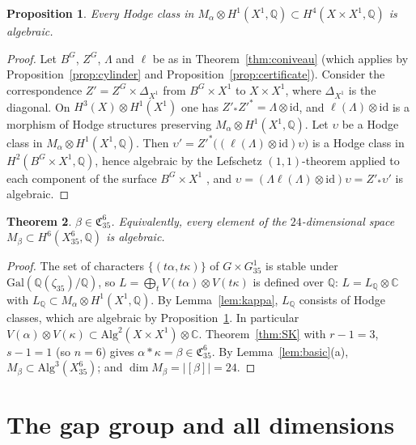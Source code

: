 \documentclass[11pt]{amsart}
\newtheorem{theorem}{Theorem}[section]
\newtheorem{proposition}[theorem]{Proposition}
\theoremstyle{definition}
\theoremstyle{remark}
\numberwithin{equation}{section}
\newcommand{\Q}{\mathbb{Q}}
\newcommand{\C}{\mathbb{C}}
\newcommand{\fC}{\mathfrak{C}}
\begin{document}
\begin{proposition}\label{prop:lefschetz}
Every Hodge class in $M_\alpha\otimes H^1(X^1,\Q)\subset H^4(X\times X^1,\Q)$ is algebraic.
\end{proposition}

\begin{proof}
Let $B^G$, $Z^G$, $\Lambda$ and $\ell$ be as in Theorem~\ref{thm:coniveau} (which applies by Proposition~\ref{prop:cylinder} and Proposition~\ref{prop:certificate}). Consider the correspondence $Z'=Z^G\times\Delta_{X^1}$ from $B^G\times X^1$ to $X\times X^1$, where $\Delta_{X^1}$ is the diagonal. On $H^3(X)\otimes H^1(X^1)$ one has $Z'_*Z'^*=\Lambda\otimes\mathrm{id}$, and $\ell(\Lambda)\otimes\mathrm{id}$ is a morphism of Hodge structures preserving $M_\alpha\otimes H^1(X^1,\Q)$. Let $\upsilon$ be a Hodge class in $M_\alpha\otimes H^1(X^1,\Q)$. Then $\upsilon'=Z'^*\bigl((\ell(\Lambda)\otimes\mathrm{id})\upsilon\bigr)$ is a Hodge class in $H^2(B^G\times X^1,\Q)$, hence algebraic by the Lefschetz $(1,1)$-theorem applied to each component of the surface $B^G\times X^1$ \cite[p.~163]{GH78}, and $\upsilon=(\Lambda\ell(\Lambda)\otimes\mathrm{id})\upsilon=Z'_*\upsilon'$ is algebraic.
\end{proof}

\begin{theorem}\label{thm:beta}
$\beta\in\fC^6_{35}$. Equivalently, every element of the $24$-dimensional space $M_\beta\subset H^6(X^6_{35},\Q)$ is algebraic.
\end{theorem}

\begin{proof}
The set of characters $\{(t\alpha,t\kappa)\}$ of $G\times G^1_{35}$ is stable under $\mathrm{Gal}(\Q(\zeta_{35})/\Q)$, so $L=\bigoplus_tV(t\alpha)\otimes V(t\kappa)$ is defined over $\Q$: $L=L_\Q\otimes\C$ with $L_\Q\subset M_\alpha\otimes H^1(X^1,\Q)$. By Lemma~\ref{lem:kappa}, $L_\Q$ consists of Hodge classes, which are algebraic by Proposition~\ref{prop:lefschetz}. In particular $V(\alpha)\otimes V(\kappa)\subset\mathrm{Alg}^2(X\times X^1)\otimes\C$. Theorem~\ref{thm:SK} with $r-1=3$, $s-1=1$ (so $n=6$) gives $\alpha*\kappa=\beta\in\fC^6_{35}$. By Lemma~\ref{lem:basic}(a), $M_\beta\subset\mathrm{Alg}^3(X^6_{35})$; and $\dim M_\beta=|[\beta]|=24$.
\end{proof}

\section{The gap group and all dimensions}\label{sec:gap}
\end{document}

